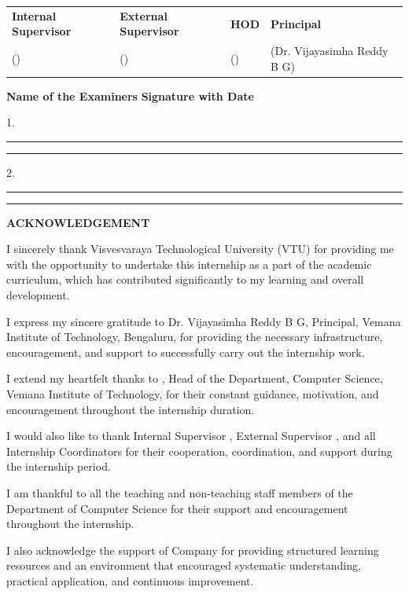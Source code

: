 \documentclass[12pt,a4paper]{report}
\begin{document}
\vspace{0.6cm}
\begin{center}
\begin{tabular}{p{} p{} p{} p{}}
\textbf{Internal Supervisor} & \textbf{External Supervisor} & \textbf{HOD} & \textbf{Principal} \\
() & () & () & (Dr. Vijayasimha Reddy B G) \\
\end{tabular}
\end{center}

\vspace{0.5cm}
\textbf{Name of the Examiners} \hfill \textbf{Signature with Date}\par
\vspace{0.2cm}
1.\enspace\rule{5cm}{0.4pt} \hfill \rule{3.5cm}{0.4pt}\par
\vspace{0.4cm}
2.\enspace\rule{5cm}{0.4pt} \hfill \rule{3.5cm}{0.4pt}\par



\newpage
\setcounter{page}{2}  %
\begin{center}
{\LARGE \textbf{ACKNOWLEDGEMENT}\par}
\end{center}

\vspace{0.5cm}
\setlength{\parindent}{1.5em}
\begin{onehalfspacing}
I sincerely thank Visvesvaraya Technological University (VTU) for providing me with the opportunity to undertake this internship as a part of the academic curriculum, which has contributed significantly to my learning and overall development.

I express my sincere gratitude to Dr. Vijayasimha Reddy B G, Principal, Vemana Institute of Technology, Bengaluru, for providing the necessary infrastructure, encouragement, and support to successfully carry out the internship work.

I extend my heartfelt thanks to , Head of the Department, Computer Science, Vemana Institute of Technology, for their constant guidance, motivation, and encouragement throughout the internship duration.

I would also like to thank Internal Supervisor , External Supervisor , and all Internship Coordinators for their cooperation, coordination, and support during the internship period.

I am thankful to all the teaching and non-teaching staff members of the Department of Computer Science for their support and encouragement throughout the internship.

I also acknowledge the support of Company for providing structured learning resources and an environment that encouraged systematic understanding, practical application, and continuous improvement.
\end{onehalfspacing}
\end{document}
